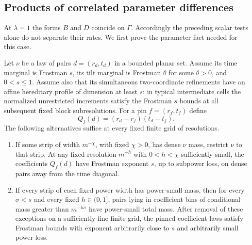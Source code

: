 \subsection{Products of correlated parameter differences}

At $\lambda=1$ the forms $B$ and $D$ coincide on $\Gamma$.
Accordingly the preceding scalar tests alone do not separate their
rates. We first prove the parameter fact needed for this case.

\begin{lemma}
\label{proj:product}
Let $\nu$ be a law of pairs $d=(r_d,t_d)$ in a bounded planar set.
Assume its time marginal is Frostman $s$, its tilt marginal is
Frostman $\theta$ for some $\theta>0$, and $0<s\le1$. Assume also
that its simultaneous two-coordinate refinements have an affine
hereditary profile of dimension at least $s$: in typical
intermediate cells the normalized unrestricted increments satisfy
the Frostman $s$ bounds at all subsequent fixed block
subresolutions. For a pin $f=(r_f,t_f)$ define
\[
 Q_f(d)=(r_d-r_f)(t_d-t_f).
\]
The following alternatives suffice at every fixed finite grid of
resolutions.
\begin{enumerate}[label=(\roman*)]
\item If some strip of width $m^{-\chi}$, with fixed $\chi>0$,
has dense $\nu$ mass, restrict $\nu$ to that strip. At any fixed
resolution $m^{-h}$ with $0<h<\chi$ sufficiently small, the
coefficients $Q_f(d)$ have Frostman exponent $s$, up to subpower
loss, on dense pairs away from the time diagonal.
\item If every strip of each fixed power width has power-small
mass, then for every $\sigma<s$ and every fixed $h\in(0,1]$,
pairs lying in coefficient bins of conditional mass greater than
$m^{-h\sigma}$ have power-small total mass. After removal of
these exceptions on a sufficiently fine finite grid, the pinned
coefficient laws satisfy Frostman bounds with exponent
arbitrarily close to $s$ and arbitrarily small power loss.
\end{enumerate}
\end{lemma}

